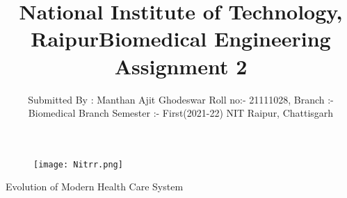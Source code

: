 \documentclass[12pt]{article}
\title{National Institute of Technology, Raipur}
\begin{document}
\maketitle
\begin{figure}[h]
\centering
\texttt{[image: Nitrr.png]}
\end{figure}
\bigskip
\bigskip
\centering
\begin{Large}
\title{Biomedical Engineering Assignment 2}
\end{Large}

\bigskip
\bigskip
\bigskip
\bigskip

\raggedright 
\author{Submitted By : Manthan Ajit Ghodeswar
\linebreak Roll no:- 21111028,
\linebreak Branch :- Biomedical Branch
\linebreak Semester :- First(2021-22)
\linebreak NIT Raipur, Chattisgarh}



\clearpage

\centering
\begin{Huge}
Evolution of Modern Health Care
\linebreak
\linebreak
\linebreak 
System 
\end{Huge}
\linebreak
\linebreak
\linebreak
\linebreak
\end{document}
